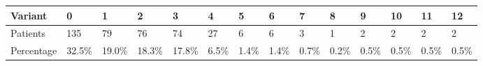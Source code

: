 \begin{tabular}{llllllllllllll}
  \hline
  \hline
Variant &     0  &     1  &     2  &     3  &    4  &    5  &    6  &    7  &    8  &    9  &    10 &    11 &    12 \\
\hline
Patients   &    135 &     79 &     76 &     74 &    27 &     6 &     6 &     3 &     1 &     2 &     2 &     2 &     2 \\
Percentage &  32.5\% &  19.0\% &  18.3\% &  17.8\% &  6.5\% &  1.4\% &  1.4\% &  0.7\% &  0.2\% &  0.5\% &  0.5\% &  0.5\% &  0.5\% \\
  \hline
  \hline
\end{tabular}
